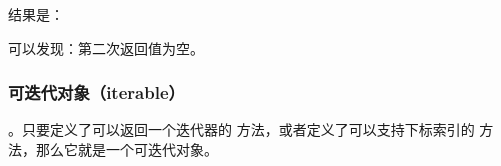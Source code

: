 \documentclass[letterpaper,10pt,english]{sphinxmanual}
\begin{document}
\begin{description}
结果是：

%
\begin{sphinxVerbatim}[commandchars=\\\{\}]
 
 
\end{sphinxVerbatim}

可以发现：第二次返回值为空。

\end{description}


\subsubsection{可迭代对象（iterable）}
\label{\detokenize{python/05_iterator:iterable}}
 。只要定义了可以返回一个迭代器的  方法，或者定义了可以支持下标索引的  方法，那么它就是一个可迭代对象。
\end{document}
